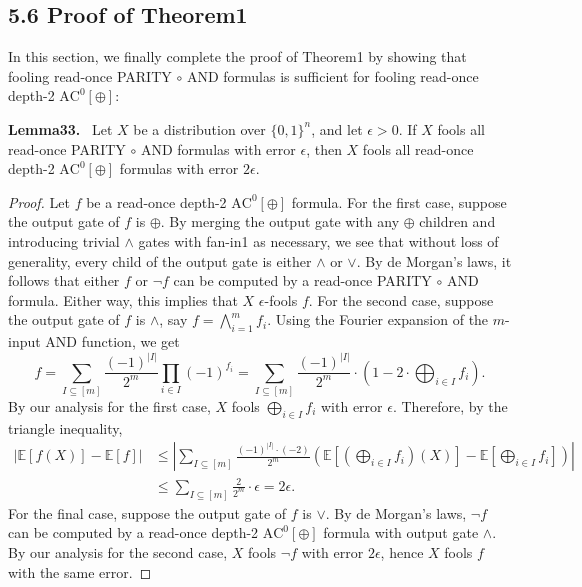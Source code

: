 \documentclass[10pt,a4paper]{article}
\newenvironment{authorclaim}[1]{\par\medskip\noindent\textbf{#1.}\ \ignorespaces}{\par\medskip}
\begin{document}
\subsection*{5.6 Proof of Theorem1}
In this section, we finally complete the proof of Theorem1 by showing that fooling read-once PARITY $\circ$ AND formulas is sufficient for fooling read-once depth-2 $\mathrm{AC}^0[\oplus]$:
\begin{authorclaim}{Lemma33}
Let $X$ be a distribution over $\{0,1\}^n$, and let $\epsilon>0$. If $X$ fools all read-once PARITY $\circ$ AND formulas with error $\epsilon$, then $X$ fools all read-once depth-2 $\mathrm{AC}^0[\oplus]$ formulas with error $2\epsilon$.
\end{authorclaim}
\begin{proof}
Let $f$ be a read-once depth-2 $\mathrm{AC}^0[\oplus]$ formula.
For the first case, suppose the output gate of $f$ is $\oplus$. By merging the output gate with any $\oplus$ children and introducing trivial $\wedge$ gates with fan-in1 as necessary, we see that without loss of generality, every child of the output gate is either $\wedge$ or $\vee$. By de Morgan's laws, it follows that either $f$ or $\neg f$ can be computed by a read-once PARITY $\circ$ AND formula. Either way, this implies that $X$ $\epsilon$-fools $f$.
For the second case, suppose the output gate of $f$ is $\wedge$, say $f=\bigwedge_{i=1}^mf_i$. Using the Fourier expansion of the $m$-input AND function, we get
\[
f=\sum_{I\subseteq[m]}\frac{(-1)^{|I|}}{2^m}\prod_{i\in I}(-1)^{f_i}
=\sum_{I\subseteq[m]}\frac{(-1)^{|I|}}{2^m}\cdot\left(1-2\cdot\bigoplus_{i\in I}f_i\right).
\]
By our analysis for the first case, $X$ fools $\bigoplus_{i\in I}f_i$ with error $\epsilon$. Therefore, by the triangle inequality,
\begin{align*}
|\mathbb E[f(X)]-\mathbb E[f]|
&\le\left|\sum_{I\subseteq[m]}\frac{(-1)^{|I|}\cdot(-2)}{2^m}
\left(\mathbb E[(\bigoplus_{i\in I}f_i)(X)]-\mathbb E[\bigoplus_{i\in I}f_i]\right)\right|\\
&\le\sum_{I\subseteq[m]}\frac2{2^m}\cdot\epsilon=2\epsilon.
\end{align*}
For the final case, suppose the output gate of $f$ is $\vee$. By de Morgan's laws, $\neg f$ can be computed by a read-once depth-2 $\mathrm{AC}^0[\oplus]$ formula with output gate $\wedge$. By our analysis for the second case, $X$ fools $\neg f$ with error $2\epsilon$, hence $X$ fools $f$ with the same error.
\end{proof}
\end{document}
